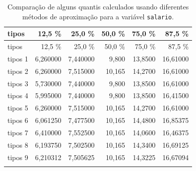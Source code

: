 \documentclass[
  10pt,
  ignorenonframetext,
]{beamer}
\begin{document}
\begin{frame}
\begin{longtable}[]{@{}lrrrrr@{}}
\caption{Comparação de alguns quantis calculados usando diferentes
métodos de aproximação para a variável \texttt{salario}.}\tabularnewline
\toprule\noalign{}
tipos & 12,5 \% & 25,0 \% & 50,0 \% & 75,0 \% & 87,5 \% \\
\midrule\noalign{}
\endfirsthead
\toprule\noalign{}
tipos & 12,5 \% & 25,0 \% & 50,0 \% & 75,0 \% & 87,5 \% \\
\midrule\noalign{}
\endhead
tipos 1 & 6,260000 & 7,440000 & 9,800 & 13,8500 & 16,61000 \\
tipos 2 & 6,260000 & 7,515000 & 10,165 & 14,2700 & 16,61000 \\
tipos 3 & 5,730000 & 7,440000 & 9,800 & 13,8500 & 16,61000 \\
tipos 4 & 5,995000 & 7,440000 & 9,800 & 13,8500 & 16,41500 \\
tipos 5 & 6,260000 & 7,515000 & 10,165 & 14,2700 & 16,61000 \\
tipos 6 & 6,061250 & 7,477500 & 10,165 & 14,4800 & 16,85375 \\
tipos 7 & 6,410000 & 7,552500 & 10,165 & 14,0600 & 16,46375 \\
tipos 8 & 6,193750 & 7,502500 & 10,165 & 14,3400 & 16,69125 \\
tipos 9 & 6,210312 & 7,505625 & 10,165 & 14,3225 & 16,67094 \\
\bottomrule\noalign{}
\end{longtable}
\end{frame}
\end{document}
